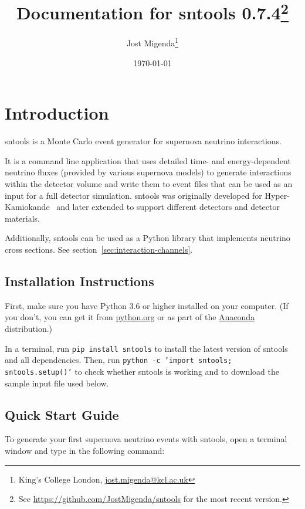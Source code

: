 \documentclass[11pt, oneside]{article}
\title{Documentation for sntools 0.7.4\footnote{See \url{https://github.com/JostMigenda/sntools} for the most recent version.}}
\author{Jost Migenda\footnote{King’s College London, \url{jost.migenda@kcl.ac.uk}}}
\date{\today}
\begin{document}
\maketitle
\setcounter{tocdepth}{2}
\tableofcontents
\clearpage


\section{Introduction}

sntools is a Monte Carlo event generator for supernova neutrino interactions.

It is a command line application that uses detailed time- and energy-dependent neutrino fluxes (provided by various supernova models) to generate interactions within the detector volume and write them to event files that can be used as an input for a full detector simulation.
sntools was originally developed for Hyper-Kamiokande~\cite{Migenda2019} and later extended to support different detectors and detector materials.

Additionally, sntools can be used as a Python library that implements neutrino cross sections. See section~\ref{sec:interaction-channels}.

\subsection{Installation Instructions}

First, make sure you have Python 3.6 or higher installed on your computer.
(If you don’t, you can get it from \href{https://www.python.org}{python.org} or as part of the \href{https://www.anaconda.com/products/individual}{Anaconda} distribution.)

In a terminal, run \texttt{pip install sntools} to install the latest version of sntools and all dependencies.
Then, run \texttt{python -c 'import sntools; sntools.setup()'} to check whether sntools is working and to download the sample input file used below.


\subsection{Quick Start Guide}

To generate your first supernova neutrino events with sntools, open a terminal window and type in the following command:
\end{document}
